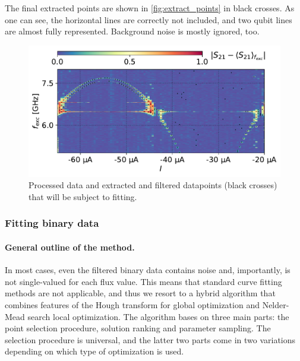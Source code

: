 \documentclass[%
 aip,
 amsmath,amssymb,
 reprint,%
]{revtex4-1}
\begin{document}
The final extracted points are shown in \autoref{fig:extract_points} in black crosses. As one can see, the horizontal lines are correctly not included, and two qubit lines are almost fully represented. Background noise is mostly ignored, too.


\begin{figure}
	\includegraphics[width=\linewidth]{extract_points}
	\caption{Processed data and extracted and filtered datapoints (black crosses) that will be subject to fitting.}
	\label{fig:extract_points}
\end{figure}

\subsubsection{Fitting binary data}

\paragraph{General outline of the method.} In most cases, even the filtered binary data contains noise and, importantly, is not single-valued for each flux value. This means that standard curve fitting methods are not applicable, and thus we resort to a hybrid algorithm that combines features of the Hough transform\cite{hough1962} for global optimization and Nelder-Mead search local optimization. The algorithm bases on three main parts: the point selection procedure, solution ranking and parameter sampling. The selection procedure is universal, and the latter two parts come in two variations depending on which type of optimization is used.
\end{document}
